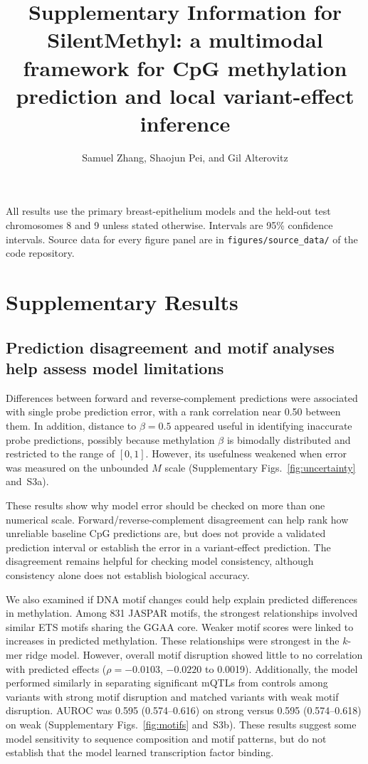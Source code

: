 \documentclass[11pt,letterpaper]{article}
\title{\Large\bfseries Supplementary Information for\\ SilentMethyl: a multimodal framework for CpG methylation prediction and local variant-effect inference}
\author{Samuel Zhang, Shaojun Pei, and Gil Alterovitz}
\date{\vspace{-2.5em}}
\begin{document}
\maketitle

All results use the primary breast-epithelium models and the held-out test chromosomes 8 and 9 unless stated otherwise. Intervals are 95\% confidence intervals. Source data for every figure panel are in \texttt{figures/source\_data/} of the code repository.

\section*{Supplementary Results}
\label{sec:supplementary_results}
\subsection*{Prediction disagreement and motif analyses help assess model limitations}
Differences between forward and reverse-complement predictions were associated with single probe prediction error, with a rank correlation near 0.50 between them. In addition, distance to $\beta = 0.5$ appeared useful in identifying inaccurate probe predictions, possibly because methylation $\beta$ is bimodally distributed and restricted to the range of $[0, 1]$. However, its usefulness weakened when error was measured on the unbounded $M$ scale (Supplementary Figs.~\ref{fig:uncertainty} and~S3a). 

These results show why model error should be checked on more than one numerical scale. Forward/reverse-complement disagreement can help rank how unreliable baseline CpG predictions are, but does not provide a validated prediction interval or establish the error in a variant-effect prediction. The disagreement remains helpful for checking model consistency, although consistency alone does not establish biological accuracy.

We also examined if DNA motif changes could help explain predicted differences in methylation. Among 831 JASPAR motifs, the strongest relationships involved similar ETS motifs sharing the GGAA core. Weaker motif scores were linked to increases in predicted methylation. These relationships were strongest in the $k$-mer ridge model. However, overall motif disruption showed little to no correlation with predicted effects ($\rho=-0.0103$, $-0.0220$ to 0.0019). Additionally, the model performed similarly in separating significant mQTLs from controls among variants with strong motif disruption and matched variants with weak motif disruption. AUROC was 0.595 (0.574--0.616) on strong versus 0.595 (0.574--0.618) on weak (Supplementary Figs.~\ref{fig:motifs} and~S3b). These results suggest some model sensitivity to sequence composition and motif patterns, but do not establish that the model learned transcription factor binding.
\end{document}
